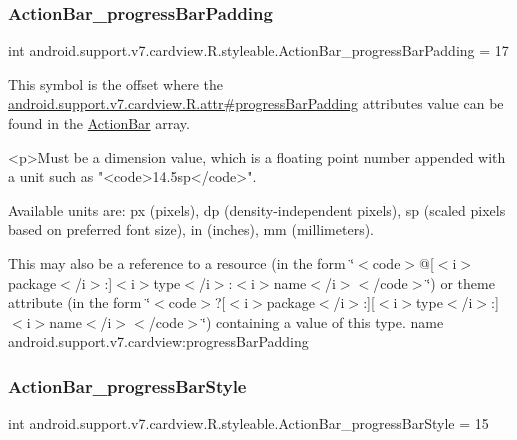 \subsubsection{\texorpdfstring{Action\+Bar\+\_\+progress\+Bar\+Padding}{ActionBar\_progressBarPadding}}
{\footnotesize\ttfamily int android.\+support.\+v7.\+cardview.\+R.\+styleable.\+Action\+Bar\+\_\+progress\+Bar\+Padding = 17\hspace{0.3cm}{\ttfamily [static]}}

This symbol is the offset where the \hyperlink{classandroid_1_1support_1_1v7_1_1cardview_1_1R_1_1attr_aa454ee24ba24198883f11140f1e6c87b}{android.\+support.\+v7.\+cardview.\+R.\+attr\#progress\+Bar\+Padding} attribute\textquotesingle{}s value can be found in the \hyperlink{classandroid_1_1support_1_1v7_1_1cardview_1_1R_1_1styleable_a0cbf7f776e31f78bb0a2b558daf176f8}{Action\+Bar} array.

\begin{DoxyVerb}      <p>Must be a dimension value, which is a floating point number appended with a unit such as "<code>14.5sp</code>".
\end{DoxyVerb}
 Available units are\+: px (pixels), dp (density-\/independent pixels), sp (scaled pixels based on preferred font size), in (inches), mm (millimeters). 

This may also be a reference to a resource (in the form \char`\"{}$<$code$>$@\mbox{[}$<$i$>$package$<$/i$>$\+:\mbox{]}$<$i$>$type$<$/i$>$\+:$<$i$>$name$<$/i$>$$<$/code$>$\char`\"{}) or theme attribute (in the form \char`\"{}$<$code$>$?\mbox{[}$<$i$>$package$<$/i$>$\+:\mbox{]}\mbox{[}$<$i$>$type$<$/i$>$\+:\mbox{]}$<$i$>$name$<$/i$>$$<$/code$>$\char`\"{}) containing a value of this type.  name android.\+support.\+v7.\+cardview\+:progress\+Bar\+Padding \mbox{\label{classandroid_1_1support_1_1v7_1_1cardview_1_1R_1_1styleable_ad007b5dd0d482faea56e41cb49451b22}} 
\subsubsection{\texorpdfstring{Action\+Bar\+\_\+progress\+Bar\+Style}{ActionBar\_progressBarStyle}}
{\footnotesize\ttfamily int android.\+support.\+v7.\+cardview.\+R.\+styleable.\+Action\+Bar\+\_\+progress\+Bar\+Style = 15\hspace{0.3cm}{\ttfamily [static]}}

